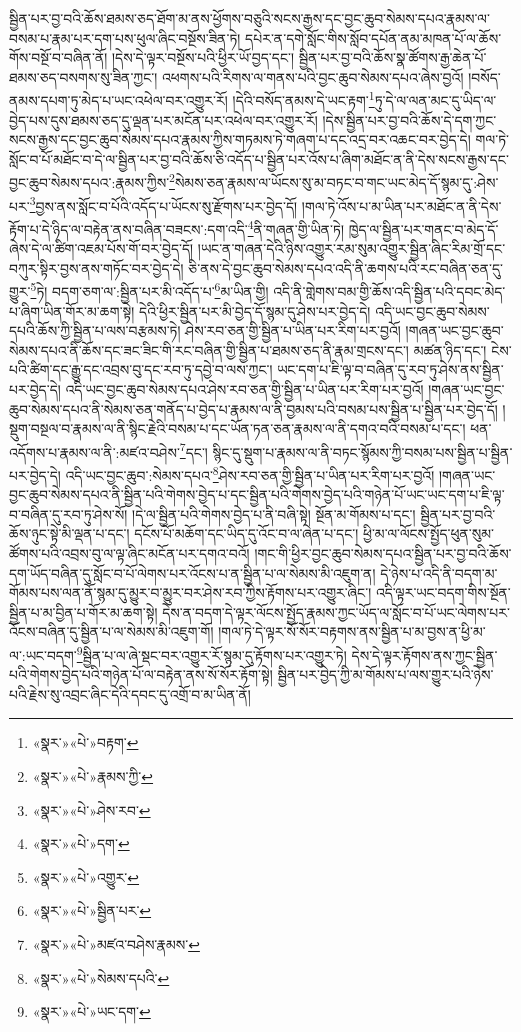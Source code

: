 སྦྱིན་པར་བྱ་བའི་ཆོས་ཐམས་ཅད་ཐོག་མ་ནས་ཕྱོགས་བཅུའི་སངས་རྒྱས་དང་བྱང་ཆུབ་སེམས་དཔའ་རྣམས་ལ་བསམ་པ་རྣམ་པར་དག་པས་ཕུལ་ཞིང་བསྔོས་ཟིན་ཏེ། དཔེར་ན་དགེ་སློང་གིས་སློབ་དཔོན་ནམ་མཁན་པོ་ལ་ཆོས་གོས་བསྔོ་བ་བཞིན་ནོ། །དེས་དེ་ལྟར་བསྔོས་པའི་ཕྱིར་ཡོ་བྱད་དང་། སྦྱིན་པར་བྱ་བའི་ཆོས་སྣ་ཚོགས་རྒྱ་ཆེན་པོ་ཐམས་ཅད་བསགས་སུ་ཟིན་ཀྱང་། འཕགས་པའི་རིགས་ལ་གནས་པའི་བྱང་ཆུབ་སེམས་དཔའ་ཞེས་བྱའོ། །བསོད་ནམས་དཔག་ཏུ་མེད་པ་ཡང་འཕེལ་བར་འགྱུར་རོ། །དེའི་བསོད་ནམས་དེ་ཡང་རྟག་\footnote{«སྣར་»«པེ་»བརྟག་}ཏུ་དེ་ལ་ལན་མང་དུ་ཡིད་ལ་བྱེད་པས་དུས་ཐམས་ཅད་དུ་ལྡན་པར་མངོན་པར་འཕེལ་བར་འགྱུར་རོ། །དེས་སྦྱིན་པར་བྱ་བའི་ཆོས་དེ་དག་ཀྱང་སངས་རྒྱས་དང་བྱང་ཆུབ་སེམས་དཔའ་རྣམས་ཀྱིས་གཏམས་ཏེ་གཞག་པ་དང་འདྲ་བར་འཆང་བར་བྱེད་དེ། གལ་ཏེ་སློང་བ་པོ་མཐོང་བ་དེ་ལ་སྦྱིན་པར་བྱ་བའི་ཆོས་ཅི་འདོད་པ་སྦྱིན་པར་འོས་པ་ཞིག་མཐོང་ན་ནི་དེས་སངས་རྒྱས་དང་བྱང་ཆུབ་སེམས་དཔའ་:རྣམས་ཀྱིས་\footnote{«སྣར་»«པེ་»རྣམས་ཀྱི་}སེམས་ཅན་རྣམས་ལ་ཡོངས་སུ་མ་བཏང་བ་གང་ཡང་མེད་དོ་སྙམ་དུ་:ཤེས་པར་\footnote{«སྣར་»«པེ་»ཤེས་རབ་}བྱས་ནས་སློང་བ་པོའི་འདོད་པ་ཡོངས་སུ་རྫོགས་པར་བྱེད་དོ། །གལ་ཏེ་འོས་པ་མ་ཡིན་པར་མཐོང་ན་ནི་དེས་རྟོག་པ་དེ་ཉིད་ལ་བརྟེན་ནས་བཞིན་བཟངས་:དག་འདི་\footnote{«སྣར་»«པེ་»དག་}ནི་གཞན་གྱི་ཡིན་ཏེ། ཁྱེད་ལ་སྦྱིན་པར་གནང་བ་མེད་དོ་ཞེས་དེ་ལ་ཚིག་འཇམ་པོས་གོ་བར་བྱེད་དོ། །ཡང་ན་གཞན་དེའི་ཉིས་འགྱུར་རམ་སུམ་འགྱུར་སྦྱིན་ཞིང་རིམ་གྲོ་དང་བཀུར་སྟིར་བྱས་ནས་གཏོང་བར་བྱེད་དེ། ཅི་ནས་དེ་བྱང་ཆུབ་སེམས་དཔའ་འདི་ནི་ཆགས་པའི་རང་བཞིན་ཅན་དུ་གྱུར་\footnote{«སྣར་»«པེ་»འགྱུར་}ཏེ། བདག་ཅག་ལ་:སྦྱིན་པར་མི་འདོད་པ་\footnote{«སྣར་»«པེ་»སྦྱིན་པར་}མ་ཡིན་གྱི། འདི་ནི་གླེགས་བམ་གྱི་ཆོས་འདི་སྦྱིན་པའི་དབང་མེད་པ་ཞིག་ཡིན་གོར་མ་ཆག་སྟེ། དེའི་ཕྱིར་སྦྱིན་པར་མི་བྱེད་དོ་སྙམ་དུ་ཤེས་པར་བྱེད་དེ། འདི་ཡང་བྱང་ཆུབ་སེམས་དཔའི་ཆོས་ཀྱི་སྦྱིན་པ་ལས་བརྩམས་ཏེ། ཤེས་རབ་ཅན་གྱི་སྦྱིན་པ་ཡིན་པར་རིག་པར་བྱའོ། །གཞན་ཡང་བྱང་ཆུབ་སེམས་དཔའ་ནི་ཆོས་དང་ཟང་ཟིང་གི་རང་བཞིན་གྱི་སྦྱིན་པ་ཐམས་ཅད་ནི་རྣམ་གྲངས་དང་། མཚན་ཉིད་དང་། ངེས་པའི་ཚིག་དང་རྒྱུ་དང་འབྲས་བུ་དང་རབ་ཏུ་དབྱེ་བ་ལས་ཀྱང་། ཡང་དག་པ་ཇི་ལྟ་བ་བཞིན་དུ་རབ་ཏུ་ཤེས་ནས་སྦྱིན་པར་བྱེད་དེ། འདི་ཡང་བྱང་ཆུབ་སེམས་དཔའ་ཤེས་རབ་ཅན་གྱི་སྦྱིན་པ་ཡིན་པར་རིག་པར་བྱའོ། །གཞན་ཡང་བྱང་ཆུབ་སེམས་དཔའ་ནི་སེམས་ཅན་གནོད་པ་བྱེད་པ་རྣམས་ལ་ནི་བྱམས་པའི་བསམ་པས་སྦྱིན་པ་སྦྱིན་པར་བྱེད་དོ། །སྡུག་བསྔལ་བ་རྣམས་ལ་ནི་སྙིང་རྗེའི་བསམ་པ་དང་ཡོན་ཏན་ཅན་རྣམས་ལ་ནི་དགའ་བའི་བསམ་པ་དང་། ཕན་འདོགས་པ་རྣམས་ལ་ནི་:མཛའ་བཤེས་\footnote{«སྣར་»«པེ་»མཛའ་བཤེས་རྣམས་}དང་། སྙིང་དུ་སྡུག་པ་རྣམས་ལ་ནི་བཏང་སྙོམས་ཀྱི་བསམ་པས་སྦྱིན་པ་སྦྱིན་པར་བྱེད་དེ། འདི་ཡང་བྱང་ཆུབ་:སེམས་དཔའ་\footnote{«སྣར་»«པེ་»སེམས་དཔའི་}ཤེས་རབ་ཅན་གྱི་སྦྱིན་པ་ཡིན་པར་རིག་པར་བྱའོ། །གཞན་ཡང་བྱང་ཆུབ་སེམས་དཔའ་ནི་སྦྱིན་པའི་གེགས་བྱེད་པ་དང་སྦྱིན་པའི་གེགས་བྱེད་པའི་གཉེན་པོ་ཡང་ཡང་དག་པ་ཇི་ལྟ་བ་བཞིན་དུ་རབ་ཏུ་ཤེས་སོ། །དེ་ལ་སྦྱིན་པའི་གེགས་བྱེད་པ་ནི་བཞི་སྟེ། སྔོན་མ་གོམས་པ་དང་། སྦྱིན་པར་བྱ་བའི་ཆོས་ཉུང་སྟེ་མི་ལྡན་པ་དང་། དངོས་པོ་མཆོག་དང་ཡིད་དུ་འོང་བ་ལ་ཞེན་པ་དང་། ཕྱི་མ་ལ་ལོངས་སྤྱོད་ཕུན་སུམ་ཚོགས་པའི་འབྲས་བུ་ལ་ལྟ་ཞིང་མངོན་པར་དགའ་བའོ། །གང་གི་ཕྱིར་བྱང་ཆུབ་སེམས་དཔའ་སྦྱིན་པར་བྱ་བའི་ཆོས་དག་ཡོད་བཞིན་དུ་སློང་བ་པོ་ལེགས་པར་འོངས་པ་ན་སྦྱིན་པ་ལ་སེམས་མི་འཇུག་ན། དེ་ཉེས་པ་འདི་ནི་བདག་མ་གོམས་པས་ལན་ནོ་སྙམ་དུ་མྱུར་བ་མྱུར་བར་ཤེས་རབ་ཀྱིས་རྟོགས་པར་འགྱུར་ཞིང་། འདི་ལྟར་ཡང་བདག་གིས་སྔོན་སྦྱིན་པ་མ་བྱིན་པ་གོར་མ་ཆག་སྟེ། དེས་ན་བདག་དེ་ལྟར་ལོངས་སྤྱོད་རྣམས་ཀྱང་ཡོད་ལ་སློང་བ་པོ་ཡང་ལེགས་པར་འོངས་བཞིན་དུ་སྦྱིན་པ་ལ་སེམས་མི་འཇུག་གོ། །གལ་ཏེ་དེ་ལྟར་སོ་སོར་བརྟགས་ནས་སྦྱིན་པ་མ་བྱས་ན་ཕྱི་མ་ལ་:ཡང་བདག་\footnote{«སྣར་»«པེ་»ཡང་དག་}སྦྱིན་པ་ལ་ཞེ་སྡང་བར་འགྱུར་རོ་སྙམ་དུ་རྟོགས་པར་འགྱུར་ཏེ། དེས་དེ་ལྟར་རྟོགས་ནས་ཀྱང་སྦྱིན་པའི་གེགས་བྱེད་པའི་གཉེན་པོ་ལ་བརྟེན་ནས་སོ་སོར་རྟོག་སྟེ། སྦྱིན་པར་བྱེད་ཀྱི་མ་གོམས་པ་ལས་གྱུར་པའི་ཉེས་པའི་རྗེས་སུ་འབྲང་ཞིང་དེའི་དབང་དུ་འགྲོ་བ་མ་ཡིན་ནོ། 